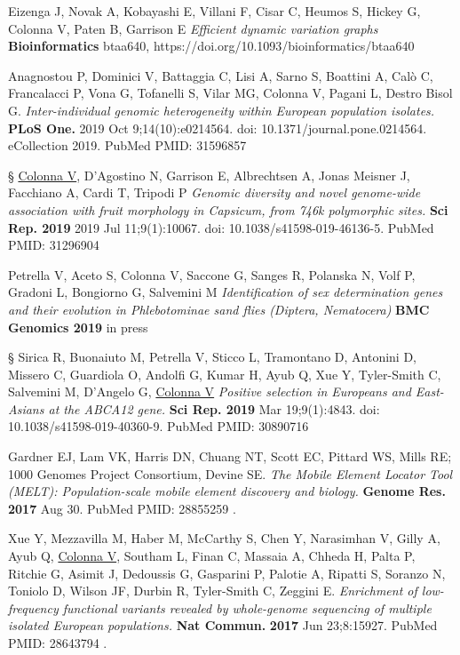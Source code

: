 \documentclass[openany]{book}
\begin{document}
\begin{enumerate} 

    \item Eizenga J, Novak A, Kobayashi E, Villani F, Cisar C,  Heumos S,  Hickey G, Colonna V, Paten B, Garrison E \textit{Efficient dynamic variation graphs} \textbf{Bioinformatics} btaa640, https://doi.org/10.1093/bioinformatics/btaa640

    \item Anagnostou P, Dominici V, Battaggia C, Lisi A, Sarno S, Boattini A, Calò C, Francalacci P, Vona G, Tofanelli S, Vilar MG, Colonna V, Pagani L, Destro Bisol G. \textit{Inter-individual genomic heterogeneity within European population isolates.} \textbf{PLoS One.} 2019 Oct 9;14(10):e0214564. doi: 10.1371/journal.pone.0214564. eCollection 2019. PubMed PMID: 31596857

    {\color{blue}\item § \underline{Colonna V}, D'Agostino N, Garrison E, Albrechtsen A, Jonas Meisner J, Facchiano A, Cardi T, Tripodi P \textit{Genomic diversity and novel genome-wide association with fruit morphology in Capsicum, from 746k polymorphic sites.} \textbf{Sci Rep. 2019} 2019 Jul 11;9(1):10067. doi: 10.1038/s41598-019-46136-5. PubMed PMID: 31296904 } 

    \item Petrella V, Aceto S, Colonna V, Saccone G, Sanges R, Polanska N, Volf P, Gradoni L, Bongiorno G, Salvemini M \textit{Identification of sex determination genes and their evolution in Phlebotominae sand flies (Diptera, Nematocera)} \textbf{ BMC Genomics 2019}  in press

    {\color{blue} \item § Sirica R, Buonaiuto M, Petrella V, Sticco L, Tramontano D, Antonini D, Missero C, Guardiola O, Andolfi G, Kumar H, Ayub Q, Xue Y, Tyler-Smith C, Salvemini M, D'Angelo G, \underline{Colonna V} \textit{Positive selection in Europeans and East-Asians at the ABCA12 gene.}  \textbf{Sci Rep. 2019}  Mar 19;9(1):4843. doi: 10.1038/s41598-019-40360-9. PubMed PMID: 30890716 } 


    \item Gardner EJ, Lam VK, Harris DN, Chuang NT, Scott EC, Pittard WS, Mills RE; 1000 Genomes Project Consortium, Devine SE. \textit{The Mobile Element Locator Tool (MELT): Population-scale mobile element discovery and biology.}  \textbf{Genome Res.} \textbf{2017} Aug 30. PubMed PMID: 28855259 .

     \item Xue Y, Mezzavilla M, Haber M, McCarthy S, Chen Y, Narasimhan V, Gilly A, Ayub Q, \underline{Colonna V}, Southam L, Finan C, Massaia A, Chheda H, Palta P, Ritchie G, Asimit J, Dedoussis G, Gasparini P, Palotie A, Ripatti S, Soranzo N, Toniolo D, Wilson JF, Durbin R, Tyler-Smith C, Zeggini E. \textit{Enrichment of low-frequency functional variants revealed by whole-genome sequencing of multiple isolated European populations.} \textbf{Nat Commun.} \textbf{2017} Jun 23;8:15927. PubMed PMID: 28643794 .



\end{enumerate}
\end{document}

